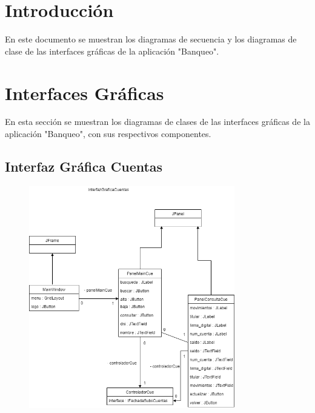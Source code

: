 \documentclass[12pt]{article}
\begin{document}
\section*{Introducción} %
En este documento se muestran los diagramas de secuencia y los diagramas de clase de las interfaces gráficas de la aplicación "Banqueo".

\section{Interfaces Gráficas} %
En esta sección se muestran los diagramas de clases de las interfaces gráficas de la aplicación "Banqueo", con sus respectivos componentes.

\subsection{Interfaz Gráfica Cuentas}
\begin{figure}[H]
    \centering
    \includegraphics[width=0.8\textwidth]{images/InterfazGraficaCuentas1.png}
\end{figure}
\end{document}
